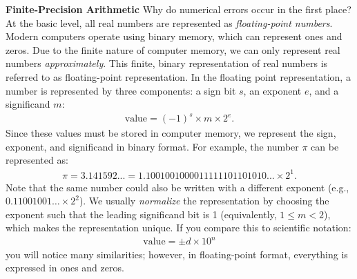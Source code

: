 \textbf{Finite-Precision Arithmetic}\quad
Why do numerical errors occur in the first place? At the basic level, all real numbers are represented as \emph{floating-point numbers}. Modern computers operate using binary memory, which can represent ones and zeros. Due to the finite nature of computer memory, we can only represent real numbers \emph{approximately}. This finite, binary representation of real numbers is referred to as floating-point representation. 
In the floating point representation, a number is represented by three components: a sign bit $s$, an exponent $e$, and a significand $m$:
\begin{align*}
\text{value} = (-1)^s \times m \times 2^e.
\end{align*}
Since these values must be stored in computer memory, we represent the sign, exponent, and significand in binary format. For example, the number $\pi$ can be represented as:
\begin{align*}
  \pi = 3.141592... = 1.1001001000011111101101010... \times 2^1.
\end{align*}
Note that the same number could also be written with a different exponent (e.g., $0.11001001\ldots \times 2^2$).
We usually \emph{normalize} the representation by choosing the exponent such that the leading significand bit is 1 (equivalently, $1 \leq m < 2$), which makes the representation unique.
If you compare this to scientific notation:
\begin{align*}
  \text{value} = \pm d \times 10^n \tag{scientific notation}
\end{align*}
you will notice many similarities; however, in floating-point format, everything is expressed in ones and zeros.



